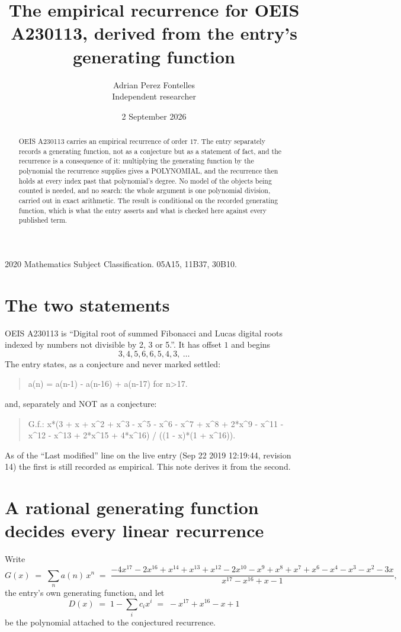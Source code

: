 \documentclass[11pt,a4paper]{article}
\title{The empirical recurrence for OEIS A230113, derived from the entry's generating function}
\author{Adrian Perez Fontelles\\ \small Independent researcher}
\date{2 September 2026}
\theoremstyle{plain}
\theoremstyle{definition}
\begin{document}
\maketitle

\begin{abstract}
OEIS A230113 carries an empirical recurrence of order $17$. The entry separately records a
generating function, not as a conjecture but as a statement of fact, and the recurrence is a
consequence of it: multiplying the generating function by the polynomial the recurrence
supplies gives a POLYNOMIAL, and the recurrence then holds at every index past that
polynomial's degree. No model of the objects being counted is needed, and no search: the
whole argument is one polynomial division, carried out in exact arithmetic. The result is
conditional on the recorded generating function, which is what the entry asserts and what is
checked here against every published term.
\end{abstract}

\noindent\small 2020 Mathematics Subject Classification. 05A15, 11B37, 30B10.\normalsize

\section{The two statements}

OEIS A230113 is ``Digital root of summed Fibonacci and Lucas digital roots indexed by numbers not divisible by 2, 3 or 5.''. It has offset $1$ and begins
\[
3, 4, 5, 6, 6, 5, 4, 3,\ \dots
\]
The entry states, as a conjecture and never marked settled:
\begin{quote}
a(n) = a(n-1) - a(n-16) + a(n-17) for n>17.
\end{quote}
and, separately and NOT as a conjecture:
\begin{quote}
G.f.: x*(3 + x + x\^{}2 + x\^{}3 - x\^{}5 - x\^{}6 - x\^{}7 + x\^{}8 + 2*x\^{}9 - x\^{}11 - x\^{}12 - x\^{}13 + 2*x\^{}15 + 4*x\^{}16) / ((1 - x)*(1 + x\^{}16)).
\end{quote}
As of the ``Last modified'' line on the live entry (Sep 22 2019 12:19:44, revision 14) the first is still
recorded as empirical. This note derives it from the second.

\section{A rational generating function decides every linear recurrence}

Write
\[
G(x)\;=\;\sum_{n}a(n)\,x^{n}\;=\;\frac{- 4 x^{17} - 2 x^{16} + x^{14} + x^{13} + x^{12} - 2 x^{10} - x^{9} + x^{8} + x^{7} + x^{6} - x^{4} - x^{3} - x^{2} - 3 x}{x^{17} - x^{16} + x - 1},
\]
the entry's own generating function, and let
\[
D(x)\;=\;1-\sum_i c_i x^{i}\;=\;- x^{17} + x^{16} - x + 1
\]
be the polynomial attached to the conjectured recurrence.
\end{document}
